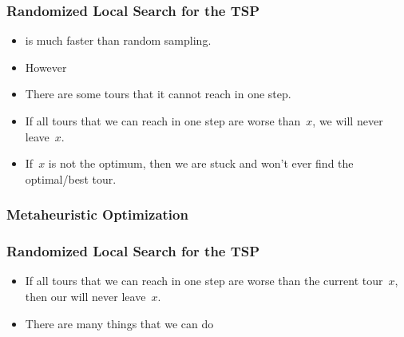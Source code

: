 \documentclass[aspectratio=169,mathserif,notheorems]{beamer}%
\begin{document}
\begin{frame}%
\frametitle{Randomized Local Search for the TSP}%
\begin{itemize}%
\item {} is much faster than random sampling.%
%
\item<2-> However%
%
\item<4-> There are some tours that it cannot reach in one step.%
%
\item<5-> If all tours that we can reach in one step are worse than~$x$, we will never leave~$x$.%
%
\item<6-> If~$x$ is not the optimum, then we are stuck and won’t ever find the optimal/best tour.%
\end{itemize}%
\end{frame}%
%
\begin{frame}%
\frametitle{Metaheuristic Optimization}%
%
\begin{center}%
%
\end{center}%
%
\end{frame}%
%
\begin{frame}%
\frametitle{Randomized Local Search for the TSP}%
\begin{itemize}%
%
\item \alert{If all tours that we can reach in one step are worse than the current tour~$x$, then our  will never leave~$x$.}%
%
\item<2-> There are many things that we can do%
\end{itemize}%
\end{frame}%
\end{document}
